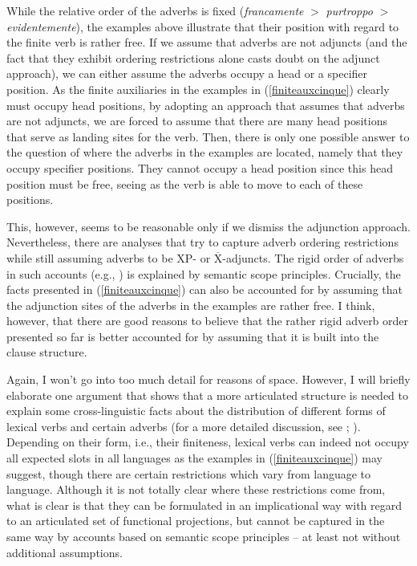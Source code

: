 \noindent While the relative order of the adverbs is fixed (\textit{francamente} $>$ \textit{purtroppo} $>$ \textit{evidentemente}), the examples above illustrate that their position with regard to the finite verb is rather free. If we assume that adverbs are not adjuncts (and the fact that they exhibit ordering restrictions alone casts doubt on the adjunct approach), we can either assume the adverbs occupy a head or a specifier position. As the finite auxiliaries in the examples in (\ref{finiteauxcinque}) clearly must occupy head positions, by adopting an approach that assumes that adverbs are not adjuncts, we are forced to assume that there are many head positions that serve as landing sites for the verb. Then, there is only one possible answer to the question of where the adverbs in the examples are located, namely that they occupy specifier positions. They cannot occupy a head position since this head position must be free, seeing as the verb is able to move to each of these positions.

This, however, seems to be reasonable only if we dismiss the adjunction approach. Nevertheless, there are analyses that try to capture adverb ordering restrictions while still assuming adverbs to be XP- or $\overline{\textrm{X}}$-adjuncts. The rigid order of adverbs in such accounts (e.g., \citealt{ernst2002syntax, ernst2007role}) is explained by semantic scope principles. Crucially, the facts presented in (\ref{finiteauxcinque}) can also be accounted for by assuming that the adjunction sites of the adverbs in the examples are rather free. I think, however, that there are good reasons to believe that the rather rigid adverb order presented so far is better accounted for by assuming that it is built into the clause structure.

Again, I won't go into too much detail for reasons of space. However, I will briefly elaborate one argument that shows that a more articulated structure is needed to explain some cross-linguistic facts about the distribution of different forms of lexical verbs and certain adverbs (for a more detailed discussion, see \citealt[44--51]{cinque1999adverbs}; \citealt{cinque2004issues}). Depending on their form, i.e., their finiteness, lexical verbs can indeed not occupy all expected slots in all languages as the examples in (\ref{finiteauxcinque}) may suggest, though there are certain restrictions which vary from language to language. Although it is not totally clear where these restrictions come from, what is clear is that they can be formulated in an implicational way with regard to an articulated set of functional projections, but cannot be captured in the same way by accounts based on semantic scope principles -- at least not without additional assumptions.

